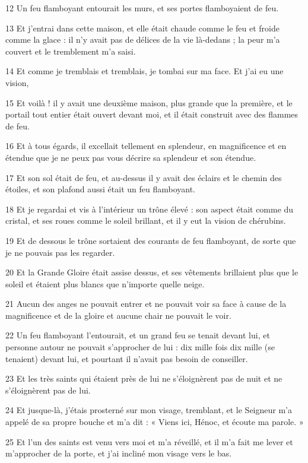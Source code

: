 \par 12 Un feu flamboyant entourait les murs, et ses portes flamboyaient de feu.
\par 13 Et j'entrai dans cette maison, et elle était chaude comme le feu et froide comme la glace : il n'y avait pas de délices de la vie là-dedans ; la peur m'a couvert et le tremblement m'a saisi.
\par 14 Et comme je tremblais et tremblais, je tombai sur ma face. Et j'ai eu une vision,
\par 15 Et voilà ! il y avait une deuxième maison, plus grande que la première, et le portail tout entier était ouvert devant moi, et il était construit avec des flammes de feu.
\par 16 Et à tous égards, il excellait tellement en splendeur, en magnificence et en étendue que je ne peux pas vous décrire sa splendeur et son étendue.
\par 17 Et son sol était de feu, et au-dessus il y avait des éclairs et le chemin des étoiles, et son plafond aussi était un feu flamboyant.
\par 18 Et je regardai et vis à l'intérieur un trône élevé : son aspect était comme du cristal, et ses roues comme le soleil brillant, et il y eut la vision de chérubins.
\par 19 Et de dessous le trône sortaient des courants de feu flamboyant, de sorte que je ne pouvais pas les regarder.
\par 20 Et la Grande Gloire était assise dessus, et ses vêtements brillaient plus que le soleil et étaient plus blancs que n'importe quelle neige.
\par 21 Aucun des anges ne pouvait entrer et ne pouvait voir sa face à cause de la magnificence et de la gloire et aucune chair ne pouvait le voir.
\par 22 Un feu flamboyant l'entourait, et un grand feu se tenait devant lui, et personne autour ne pouvait s'approcher de lui : dix mille fois dix mille (se tenaient) devant lui, et pourtant il n'avait pas besoin de conseiller.
\par 23 Et les très saints qui étaient près de lui ne s'éloignèrent pas de nuit et ne s'éloignèrent pas de lui.
\par 24 Et jusque-là, j'étais prosterné sur mon visage, tremblant, et le Seigneur m'a appelé de sa propre bouche et m'a dit : « Viens ici, Hénoc, et écoute ma parole. »
\par 25 Et l'un des saints est venu vers moi et m'a réveillé, et il m'a fait me lever et m'approcher de la porte, et j'ai incliné mon visage vers le bas.

